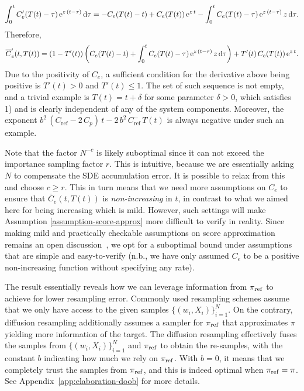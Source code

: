 \documentclass{article}
\begin{document}
%
\begin{equation}
	\int^t_0 C'_e(T(t) - \tau) \, \mathrm{e}^{z \, (t-\tau)} \mathop{}\!\mathrm{d} \tau = -C_e(T(t) - t) + C_e(T(t)) \, \mathrm{e}^{z \, t} - \int^t_0 C_e(T(t)-\tau) \, \mathrm{e}^{z \, (t - \tau)} \, z \mathop{}\!\mathrm{d} \tau. 
\end{equation}
%
Therefore, 
%
\begin{equation}
	\overline{C}_e'(t, T(t)) = (1 - T'(t)) \, \biggl( C_e(T(t) - t) + \int^t_0 C_e(T(t)-\tau) \, \mathrm{e}^{z \, (t - \tau)} \, z \mathop{}\!\mathrm{d} \tau \biggr) + T'(t) \, C_e(T(t)) \, \mathrm{e}^{z \, t}.
\end{equation}
%
Due to the positivity of $C_e$, a sufficient condition for the derivative above being positive is $T'(t) > 0$ and $T'(t) \leq 1$. 
The set of such sequence is not empty, and a trivial example is $T(t) = t + \delta$ for some parameter $\delta >0$, which satisfies 1) and is clearly independent of any of the system components. 
Moreover, the exponent $b^2 \,(C_{\mathrm{ref}} - 2\, C_p) \, t - 2 \, b^2 \, C_\mathrm{ref}^- \, T(t)$ is always negative under such an example. 

Note that the factor $N^{-c}$ is likely suboptimal since it can not exceed the importance sampling factor $r$. 
This is intuitive, because we are essentially asking $N$ to compensate the SDE accumulation error. 
It is possible to relax from this and choose $c \geq r$. 
This in turn means that we need more assumptions on $C_e$ to ensure that $\overline{C}_e(t, T(t))$ is \emph{non-increasing} in $t$, in contrast to what we aimed here for being increasing which is mild. 
However, such settings will make Assumption \ref{assumption-score-approx} more difficult to verify in reality. 
Since making mild and practically checkable assumptions on score approximation remains an open discussion~\citep[see, e.g.,][]{DeBortoli2022convergence, Chen2023sampling}, we opt for a suboptimal bound under assumptions that are simple and easy-to-verify (n.b., we have only assumed $C_e$ to be a positive non-increasing function without specifying any rate). 

The result essentially reveals how we can leverage information from $\pi_{\mathrm{ref}}$ to achieve for lower resampling error. 
Commonly used resampling schemes assume that we only have access to the given samples $\lbrace (w_i, X_i) \rbrace_{i=1}^N$. 
On the contrary, diffusion resampling additionally assumes a sampler for $\pi_{\mathrm{ref}}$ that approximates $\pi$ yielding more information of the target. 
The diffusion resampling effectively fuses the samples from $\lbrace (w_i, X_i) \rbrace_{i=1}^N$ and $\pi_{\mathrm{ref}}$ to obtain the re-samples, with the constant $b$ indicating how much we rely on $\pi_{\mathrm{ref}}$. 
With $b=0$, it means that we completely trust the samples from $\pi_{\mathrm{ref}}$, and this is indeed optimal when $\pi_{\mathrm{ref}}=\pi$. 
See Appendix~\ref{app:elaboration-doob} for more details.
\end{document}
